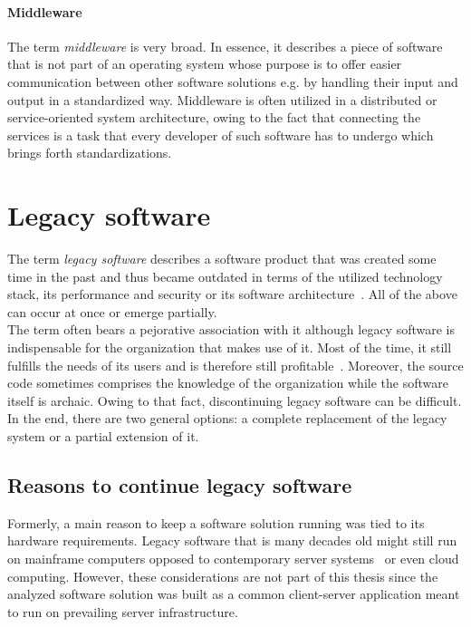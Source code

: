 \documentclass[12pt,a4paper,twoside]{report}
\begin{document}
\paragraph{Middleware}
The term \textit{middleware} is very broad. In essence, it describes a piece
of software that is not part of an operating system whose purpose is to
offer easier communication between other software solutions e.g. by handling
their input and output in a standardized way.
Middleware is often utilized in a distributed or service-oriented system architecture,
owing to the fact that connecting the services is a task that every developer
of such software has to undergo which brings forth standardizations.


\section{Legacy software} \label{sect:legacy-software}

The term \textit{legacy software} describes a software product that was created
some time in the past and thus became outdated in terms of the utilized technology
stack, its performance and security or its software architecture~\cite{seacord-modernizing-legacy}.
All of the above can occur at once or emerge partially.\\
The term often bears a pejorative association with it although legacy software
is indispensable for the organization that makes use of it. Most of the time, it
still fulfills the needs of its users and is therefore still profitable~\cite{bennett-coping-legacy}.
Moreover, the source code sometimes comprises the knowledge of the organization while
the software itself is archaic. Owing to that fact, discontinuing legacy software can be difficult.
In the end, there are two general options: a complete replacement of the legacy system or
a partial extension of it.


\subsection{Reasons to continue legacy software} \label{sub-sect:continue-legacy}

Formerly, a main reason to keep a software solution running was tied to its
hardware requirements. Legacy software that is many decades old might still
run on mainframe computers opposed to contemporary server systems~\cite{schneidewind-preserve-or-redesign}
or even cloud computing. However, these considerations are not part of this thesis
since the analyzed software solution was built as a common client-server application
meant to run on prevailing server infrastructure.
\end{document}
